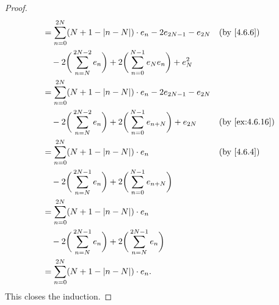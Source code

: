 \begin{proof}
\begin{align*}
     & = \sum_{n = 0}^{2N} (N + 1 - \abs{n - N}) \cdot e_n - 2 e_{2N - 1} - e_{2N}                                       &  & \by{4.6.6}                   \\
     & \quad - 2 \bigg(\sum_{n = N}^{2N - 2} e_n\bigg) + 2 \bigg(\sum_{n = 0}^{N - 1} e_N e_n\bigg) + e_N^2                                                \\
     & = \sum_{n = 0}^{2N} (N + 1 - \abs{n - N}) \cdot e_n - 2 e_{2N - 1} - e_{2N}                                                                         \\
     & \quad - 2 \bigg(\sum_{n = N}^{2N - 2} e_n\bigg) + 2 \bigg(\sum_{n = 0}^{N - 1} e_{n + N}\bigg) + e_{2N}           &  & \text{(by \cref{ex:4.6.16})} \\
     & = \sum_{n = 0}^{2N} (N + 1 - \abs{n - N}) \cdot e_n                                                               &  & \by{4.6.4}                   \\
     & \quad - 2 \bigg(\sum_{n = N}^{2N - 1} e_n\bigg) + 2 \bigg(\sum_{n = 0}^{N - 1} e_{n + N}\bigg)                                                      \\
     & = \sum_{n = 0}^{2N} (N + 1 - \abs{n - N}) \cdot e_n                                                                                                 \\
     & \quad - 2 \bigg(\sum_{n = N}^{2N - 1} e_n\bigg) + 2 \bigg(\sum_{n = N}^{2N - 1} e_n\bigg)                                                           \\
     & = \sum_{n = 0}^{2N} (N + 1 - \abs{n - N}) \cdot e_n.
  \end{align*}
  This closes the induction.


\end{proof}
